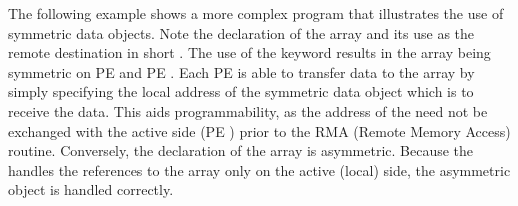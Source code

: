 The following example shows a more complex \openshmem program that illustrates the use of symmetric data objects.  Note the declaration of the   array and its use as the remote destination in \openshmem short \PUT.  The use of the  keyword results in the  array being symmetric on \ac{PE}  and \ac{PE} .  Each \ac{PE} is able to transfer data to the \dest{} array by simply specifying the local address of the symmetric data object which is to receive the data.  This aids programmability, as the address of the \dest{} need not be exchanged with the active side (\ac{PE} ) prior to the RMA (Remote Memory Access) routine.  Conversely, the declaration of the  array is asymmetric.  Because the \PUT{} handles the references to the  array only on the active (local) side, the asymmetric \source{} object is handled correctly.

\begin{minipage}{\linewidth}
\vspace{0.1in}
\vspace{0.1in}
\end{minipage}
